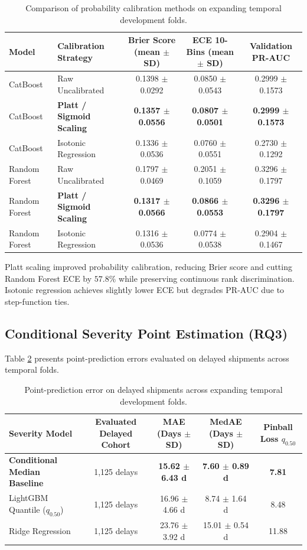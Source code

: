 \documentclass[11pt,a4paper]{article}
\begin{document}
\begin{table}[htbp]
\centering
\caption{Comparison of probability calibration methods on expanding temporal development folds.}
\label{tab:calibration_benchmark}
\small
\begin{tabular}{llccc}
\toprule
\textbf{Model} & \textbf{Calibration Strategy} & \textbf{Brier Score (mean $\pm$ SD)} & \textbf{ECE 10-Bins (mean $\pm$ SD)} & \textbf{Validation PR-AUC} \\
\midrule
CatBoost & Raw Uncalibrated & 0.1398 $\pm$ 0.0292 & 0.0850 $\pm$ 0.0543 & 0.2999 $\pm$ 0.1573 \\
CatBoost & \textbf{Platt / Sigmoid Scaling} & \textbf{0.1357 $\pm$ 0.0556} & \textbf{0.0807 $\pm$ 0.0501} & \textbf{0.2999 $\pm$ 0.1573} \\
CatBoost & Isotonic Regression & 0.1336 $\pm$ 0.0536 & 0.0760 $\pm$ 0.0551 & 0.2730 $\pm$ 0.1292 \\
\midrule
Random Forest & Raw Uncalibrated & 0.1797 $\pm$ 0.0469 & 0.2051 $\pm$ 0.1059 & 0.3296 $\pm$ 0.1797 \\
Random Forest & \textbf{Platt / Sigmoid Scaling} & \textbf{0.1317 $\pm$ 0.0566} & \textbf{0.0866 $\pm$ 0.0553} & \textbf{0.3296 $\pm$ 0.1797} \\
Random Forest & Isotonic Regression & 0.1316 $\pm$ 0.0536 & 0.0774 $\pm$ 0.0538 & 0.2904 $\pm$ 0.1467 \\
\bottomrule
\end{tabular}
\end{table}

Platt scaling improved probability calibration, reducing Brier score and cutting Random Forest ECE by $57.8\%$ while preserving continuous rank discrimination. Isotonic regression achieves slightly lower ECE but degrades PR-AUC due to step-function ties.

\subsection{Conditional Severity Point Estimation (RQ3)}
Table \ref{tab:severity_benchmark} presents point-prediction errors evaluated on delayed shipments across temporal folds.

\begin{table}[htbp]
\centering
\caption{Point-prediction error on delayed shipments across expanding temporal development folds.}
\label{tab:severity_benchmark}
\small
\begin{tabular}{lcccc}
\toprule
\textbf{Severity Model} & \textbf{Evaluated Delayed Cohort} & \textbf{MAE (Days $\pm$ SD)} & \textbf{MedAE (Days $\pm$ SD)} & \textbf{Pinball Loss $q_{0.50}$} \\
\midrule
\textbf{Conditional Median Baseline} & 1,125 delays & \textbf{15.62 $\pm$ 6.43 d} & \textbf{7.60 $\pm$ 0.89 d} & \textbf{7.81} \\
LightGBM Quantile ($q_{0.50}$) & 1,125 delays & 16.96 $\pm$ 4.66 d & 8.74 $\pm$ 1.64 d & 8.48 \\
Ridge Regression & 1,125 delays & 23.76 $\pm$ 3.92 d & 15.01 $\pm$ 0.54 d & 11.88 \\
\bottomrule
\end{tabular}
\end{table}
\end{document}

